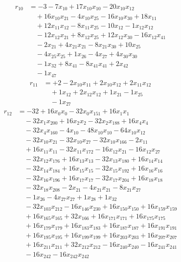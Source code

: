 \[\begin{aligned}
r_{10} &= - 3 - 7 x_{10} + 17 x_{10} x_{10} - 20 x_{10} x_{12} \\
 &\quad + 16 x_{10} x_{21} - 4 x_{10} x_{25} - 16 x_{10} x_{30} + 18 x_{11} \\
 &\quad + 12 x_{11} x_{12} - 8 x_{11} x_{25} - 10 x_{12} - 1 x_{12} x_{12} \\
 &\quad - 12 x_{12} x_{21} + 8 x_{12} x_{25} + 12 x_{12} x_{30} - 16 x_{12} x_{41} \\
 &\quad - 2 x_{21} + 4 x_{21} x_{21} - 8 x_{21} x_{30} + 10 x_{25} \\
 &\quad - 4 x_{25} x_{25} + 1 x_{26} - 4 x_{27} + 4 x_{30} x_{30} \\
 &\quad - 1 x_{32} + 8 x_{41} - 8 x_{41} x_{41} + 2 x_{42} \\
 &\quad - 1 x_{47}
\end{aligned}\]
\[\begin{aligned}
r_{11} &= + 2 - 2 x_{10} x_{11} + 2 x_{10} x_{12} + 2 x_{11} x_{12} \\
 &\quad + 1 x_{12} + 2 x_{12} x_{12} + 1 x_{21} - 1 x_{25} \\
 &\quad - 1 x_{27}
\end{aligned}\]
\[\begin{aligned}
r_{12} &= - 32 + 16 x_{0} x_{0} - 32 x_{0} x_{151} + 16 x_{1} x_{1} \\
 &\quad - 32 x_{1} x_{200} + 16 x_{2} x_{2} - 32 x_{2} x_{188} + 16 x_{4} x_{4} \\
 &\quad - 32 x_{4} x_{160} - 4 x_{10} - 48 x_{10} x_{10} - 64 x_{10} x_{12} \\
 &\quad - 32 x_{10} x_{21} - 32 x_{10} x_{27} - 32 x_{10} x_{166} - 2 x_{11} \\
 &\quad + 16 x_{11} x_{11} - 32 x_{11} x_{172} - 16 x_{12} x_{21} - 16 x_{12} x_{27} \\
 &\quad - 32 x_{12} x_{176} + 16 x_{13} x_{13} - 32 x_{13} x_{180} + 16 x_{14} x_{14} \\
 &\quad - 32 x_{14} x_{184} + 16 x_{15} x_{15} - 32 x_{15} x_{192} + 16 x_{16} x_{16} \\
 &\quad - 32 x_{16} x_{196} + 16 x_{17} x_{17} - 32 x_{17} x_{204} + 16 x_{18} x_{18} \\
 &\quad - 32 x_{18} x_{208} - 2 x_{21} - 4 x_{21} x_{21} - 8 x_{21} x_{27} \\
 &\quad - 1 x_{26} - 4 x_{27} x_{27} + 1 x_{28} + 1 x_{32} \\
 &\quad - 32 x_{103} x_{212} - 16 x_{146} x_{230} + 16 x_{150} x_{150} + 16 x_{159} x_{159} \\
 &\quad + 16 x_{165} x_{165} + 32 x_{166} + 16 x_{171} x_{171} + 16 x_{175} x_{175} \\
 &\quad + 16 x_{179} x_{179} + 16 x_{183} x_{183} + 16 x_{187} x_{187} + 16 x_{191} x_{191} \\
 &\quad + 16 x_{195} x_{195} + 16 x_{199} x_{199} + 16 x_{203} x_{203} + 16 x_{207} x_{207} \\
 &\quad + 16 x_{211} x_{211} + 32 x_{212} x_{212} - 16 x_{240} x_{240} - 16 x_{241} x_{241} \\
 &\quad - 16 x_{242} - 16 x_{242} x_{242}
\end{aligned}\]

